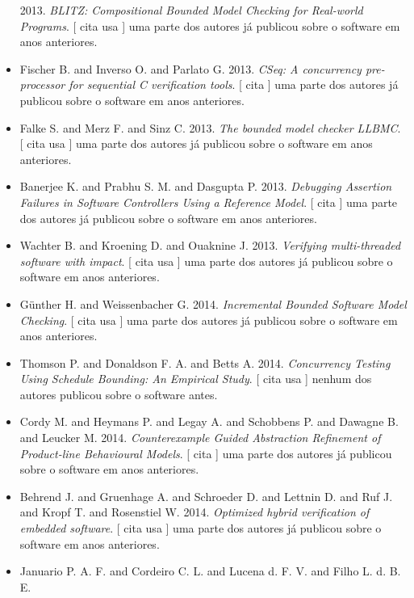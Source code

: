 \begin{itemize}
      2013.
        \textit{ BLITZ: Compositional Bounded Model Checking for Real-world Programs}.
      [
          cita
          usa
      ]
uma parte dos autores já publicou sobre o software em anos anteriores.
\item Fischer B. and Inverso O. and Parlato G.
      2013.
        \textit{ CSeq: A concurrency pre-processor for sequential C verification tools}.
      [
          cita
      ]
uma parte dos autores já publicou sobre o software em anos anteriores.
\item Falke S. and Merz F. and Sinz C.
      2013.
        \textit{ The bounded model checker LLBMC}.
      [
          cita
          usa
      ]
uma parte dos autores já publicou sobre o software em anos anteriores.
\item Banerjee K. and Prabhu S. M. and Dasgupta P.
      2013.
        \textit{ Debugging Assertion Failures in Software Controllers Using a Reference Model}.
      [
          cita
      ]
uma parte dos autores já publicou sobre o software em anos anteriores.
\item Wachter B. and Kroening D. and Ouaknine J.
      2013.
        \textit{ Verifying multi-threaded software with impact}.
      [
          cita
          usa
      ]
uma parte dos autores já publicou sobre o software em anos anteriores.
\item G\"{u}nther H. and Weissenbacher G.
      2014.
        \textit{ Incremental Bounded Software Model Checking}.
      [
          cita
          usa
      ]
uma parte dos autores já publicou sobre o software em anos anteriores.
\item Thomson P. and Donaldson F. A. and Betts A.
      2014.
        \textit{ Concurrency Testing Using Schedule Bounding: An Empirical Study}.
      [
          cita
          usa
      ]
nenhum dos autores publicou sobre o software antes.
\item Cordy M. and Heymans P. and Legay A. and Schobbens P. and Dawagne B. and Leucker M.
      2014.
        \textit{ Counterexample Guided Abstraction Refinement of Product-line Behavioural Models}.
      [
          cita
      ]
uma parte dos autores já publicou sobre o software em anos anteriores.
\item Behrend J. and Gruenhage A. and Schroeder D. and Lettnin D. and Ruf J. and Kropf T. and Rosenstiel W.
      2014.
        \textit{ Optimized hybrid verification of embedded software}.
      [
          cita
          usa
      ]
uma parte dos autores já publicou sobre o software em anos anteriores.
\item Januario P. A. F. and Cordeiro C. L. and Lucena d. F. V. and Filho L. d. B. E.

\end{itemize}
